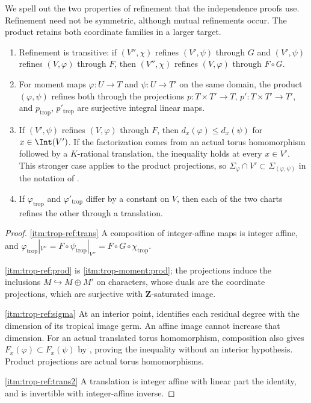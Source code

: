 We spell out the two properties of refinement that the independence proofs
use. Refinement need not be symmetric, although mutual refinements occur.
The product retains both coordinate families in a larger target.

\begin{lemma}
\label{lem:trop-refinement-calculus}
\begin{enumerate}
\item\label{itm:trop-ref:trans} Refinement is transitive: if
  $(V'',\chi)$ refines $(V',\psi)$ through $G$ and $(V',\psi)$ refines
  $(V,\varphi)$ through $F$, then $(V'',\chi)$ refines $(V,\varphi)$ through
  $F\circ G$.
\item\label{itm:trop-ref:prod} For moment maps $\varphi:U\to T$ and
  $\psi:U\to T'$ on the same domain, the product $(\varphi,\psi)$ refines
  both through the projections $p:T\times T'\to T$, $p':T\times T'\to T'$,
  and $p_{\mathrm{trop}}$, $p'_{\mathrm{trop}}$ are surjective integral
  linear maps.
\item\label{itm:trop-ref:sigma} If $(V',\psi)$ refines $(V,\varphi)$ through
  $F$, then $d_x(\varphi)\le d_x(\psi)$ for $x\in\Int(V')$.
  If the factorization comes from an actual torus homomorphism followed by
  a $K$-rational translation, the inequality holds at every $x\in V'$.
  This stronger case applies to the product projections, so
  $\Sigma_\varphi\cap V'\subset\Sigma_{(\varphi,\psi)}$ in the notation
  of .
\item\label{itm:trop-ref:trans2} If $\varphi_{\mathrm{trop}}$ and
  $\varphi'_{\mathrm{trop}}$ differ by a constant on $V$, then each of the
  two charts refines the other through a translation.
\end{enumerate}
\end{lemma}

\begin{proof}
\cref{itm:trop-ref:trans} A composition of integer-affine maps is integer
affine, and
$\varphi_{\mathrm{trop}}|_{V''}=F\circ\psi_{\mathrm{trop}}|_{V''}
=F\circ G\circ\chi_{\mathrm{trop}}$.

\cref{itm:trop-ref:prod} is 
\cref{itm:trop-moment:prod}; the projections induce the inclusions
$M\hookrightarrow M\oplus M'$ on characters, whose duals are the coordinate
projections, which are surjective with $\mathbf Z$-saturated image.

\cref{itm:trop-ref:sigma} At an interior point,
 identifies each residual degree with the
dimension of its tropical image germ. An affine image cannot increase that
dimension. For an actual translated torus homomorphism, composition also
gives $F_x(\varphi)\subset F_x(\psi)$ by
, proving the inequality without an
interior hypothesis. Product projections are actual torus homomorphisms.

\cref{itm:trop-ref:trans2} A translation is integer affine with linear part
the identity, and is invertible with integer-affine inverse.
\end{proof}

